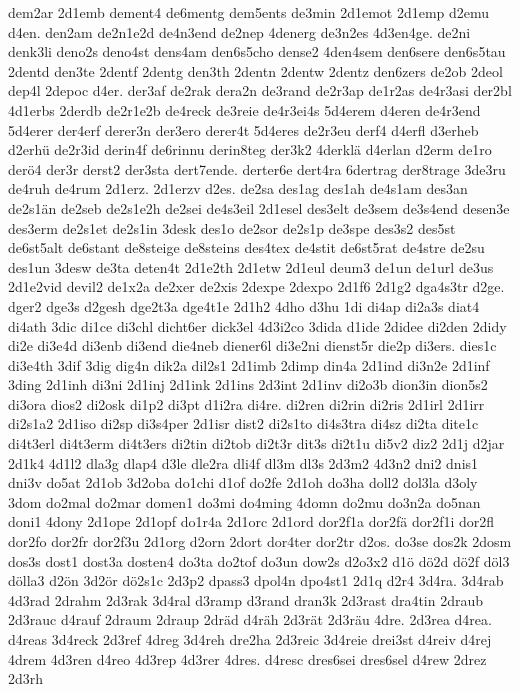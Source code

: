 {dem2ar
2d1emb
dement4
de6mentg
dem5ents
de3min
2d1emot
2d1emp
d2emu
d4en.
den2am
de2n1e2d
de4n3end
de2nep
4denerg
de3n2es
4d3en4ge.
de2ni
denk3li
deno2s
deno4st
dens4am
den6s5cho
dense2
4den4sem
den6sere
den6s5tau
2dentd
den3te
2dentf
2dentg
den3th
2dentn
2dentw
2dentz
den6zers
de2ob
2deol
dep4l
2depoc
d4er.
der3af
de2rak
dera2n
de3rand
de2r3ap
de1r2as
de4r3asi
der2bl
4d1erbs
2derdb
de2r1e2b
de4reck
de3reie
de4r3ei4s
5d4erem
d4eren
de4r3end
5d4erer
der4erf
derer3n
der3ero
derer4t
5d4eres
de2r3eu
derf4
d4erfl
d3erheb
d2erhü
de2r3id
derin4f
de6rinnu
derin8teg
der3k2
4derklä
d4erlan
d2erm
de1ro
derö4
der3r
derst2
der3sta
dert7ende.
derter6e
dert4ra
6dertrag
der8trage
3de3ru
de4ruh
de4rum
2d1erz.
2d1erzv
d2es.
de2sa
des1ag
des1ah
de4s1am
des3an
de2s1än
de2seb
de2s1e2h
de2sei
de4s3eil
2d1esel
des3elt
de3sem
de3s4end
desen3e
des3erm
de2s1et
de2s1in
3desk
des1o
de2sor
de2s1p
de3spe
des3s2
des5st
de6st5alt
de6stant
de8steige
de8steins
des4tex
de4stit
de6st5rat
de4stre
de2su
des1un
3desw
de3ta
deten4t
2d1e2th
2d1etw
2d1eul
deum3
de1un
de1url
de3us
2d1e2vid
devil2
de1x2a
de2xer
de2xis
2dexpe
2dexpo
2d1f6
2d1g2
dga4s3tr
d2ge.
dger2
dge3s
d2gesh
dge2t3a
dge4t1e
2d1h2
4dho
d3hu
1di
di4ap
di2a3s
diat4
di4ath
3dic
di1ce
di3chl
dicht6er
dick3el
4d3i2co
3dida
d1ide
2didee
di2den
2didy
di2e
di3e4d
di3enb
di3end
die4neb
diener6l
di3e2ni
dienst5r
die2p
di3ers.
dies1c
di3e4th
3dif
3dig
dig4n
dik2a
dil2s1
2d1imb
2dimp
din4a
2d1ind
di3n2e
2d1inf
3ding
2d1inh
di3ni
2d1inj
2d1ink
2d1ins
2d3int
2d1inv
di2o3b
dion3in
dion5s2
di3ora
dios2
di2osk
di1p2
di3pt
d1i2ra
di4re.
di2ren
di2rin
di2ris
2d1irl
2d1irr
di2s1a2
2d1iso
di2sp
di3s4per
2d1isr
dist2
di2s1to
di4s3tra
di4sz
di2ta
dite1c
di4t3erl
di4t3erm
di4t3ers
di2tin
di2tob
di2t3r
dit3s
di2t1u
di5v2
diz2
2d1j
d2jar
2d1k4
4d1l2
dla3g
dlap4
d3le
dle2ra
dli4f
dl3m
dl3s
2d3m2
4d3n2
dni2
dnis1
dni3v
do5at
2d1ob
3d2oba
do1chi
d1of
do2fe
2d1oh
do3ha
doll2
dol3la
d3oly
3dom
do2mal
do2mar
domen1
do3mi
do4ming
4domn
do2mu
do3n2a
do5nan
doni1
4dony
2d1ope
2d1opf
do1r4a
2d1orc
2d1ord
dor2f1a
dor2fä
dor2f1i
dor2fl
dor2fo
dor2fr
dor2f3u
2d1org
d2orn
2dort
dor4ter
dor2tr
d2os.
do3se
dos2k
2dosm
dos3s
dost1
dost3a
dosten4
do3ta
do2tof
do3un
dow2s
d2o3x2
d1ö
dö2d
dö2f
döl3
dölla3
d2ön
3d2ör
dö2s1c
2d3p2
dpass3
dpol4n
dpo4st1
2d1q
d2r4
3d4ra.
3d4rab
4d3rad
2drahm
2d3rak
3d4ral
d3ramp
d3rand
dran3k
2d3rast
dra4tin
2draub
2d3rauc
d4rauf
2draum
2draup
2dräd
d4räh
2d3rät
2d3räu
4dre.
2d3rea
d4rea.
d4reas
3d4reck
2d3ref
4dreg
3d4reh
dre2ha
2d3reic
3d4reie
drei3st
d4reiv
d4rej
4drem
4d3ren
d4reo
4d3rep
4d3rer
4dres.
d4resc
dres6sei
dres6sel
d4rew
2drez
2d3rh
}
